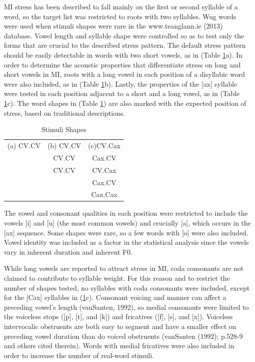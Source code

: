 \documentclass[floatsintext,man]{apa6}
\theoremstyle{definition}
\theoremstyle{definition}
\theoremstyle{definition}
\theoremstyle{remark}
\begin{document}
MI stress has been described to fall mainly on the first or second
syllable of a word, so the target list was restricted to roots with two
syllables. Wug words were used when stimuli shapes were rare in the
www.teanglann.ie (2013) database. Vowel length and syllable shape were
controlled so as to test only the forms that are crucial to the
described stress pattern. The default stress pattern should be easily
detectable in words with two short vowels, as in (Table
\ref{stim_shape}a). In order to determine the acoustic properties that
differentiate stress on long and short vowels in MI, roots with a long
vowel in each position of a disyllabic word were also included, as in
(Table \ref{stim_shape}b). Lastly, the properties of the {[}ax{]}
syllable were tested in each position adjacent to a short and a long
vowel, as in (Table \ref{stim_shape}c). The word shapes in (Table
\ref{stim_shape}) are also marked with the expected position of stress,
based on traditional descriptions.

\begin{table}
  \caption{Stimuli Shapes}
  \begin{tabular}{c c c}
  (a) \textipa{"}CV.CV & (b) \textipa{"}CV\textipa{:}.CV        & (c)CV.\textipa{"}Cax\\
                       &    CV.\textipa{"}CV\textipa{:}           & \textipa{"}Cax.CV\\
                       & \textipa{"}CV\textipa{:}.CV\textipa{:} &   \textipa{"}CV\textipa{:}.Cax\\
                                     &                                        & Cax.\textipa{"}CV\textipa{:}\\  
                       &                                        & \textipa{"}Cax.Cax
  \label{stim_shape}
  \end{tabular}
\end{table}

The vowel and consonant qualities in each position were restricted to
include the vowels {[}i{]} and {[}u{]} (the most common vowels) and
crucially {[}a{]}, which occurs in the {[}ax{]} sequence. Some shapes
were rare, so a few words with {[}o{]} were also included. Vowel
identity was included as a factor in the statistical analysis since the
vowels vary in inherent duration and inherent F0.

While long vowels are reported to attract stress in MI, coda consonants
are not claimed to contribute to syllable weight. For this reason and to
restrict the number of shapes tested, no syllables with coda consonants
were included, except for the {[}Cax{]} syllables in
(\ref{stim_shape}c). Consonant voicing and manner can affect a preceding
vowel's length (vanSanten, 1992), so medial consonants were limited to
the voiceless stops ({[}p{]}, {[}t{]}, and {[}k{]}) and fricatives
({[}f{]}, {[}s{]}, and {[}x{]}). Voiceless intervocalic obstruents are
both easy to segment and have a smaller effect on preceding vowel
duration than do voiced obstruents (vanSanten (1992); p.528-9 and others
cited therein). Words with medial fricatives were also included in order
to increase the number of real-word stimuli.
\end{document}
